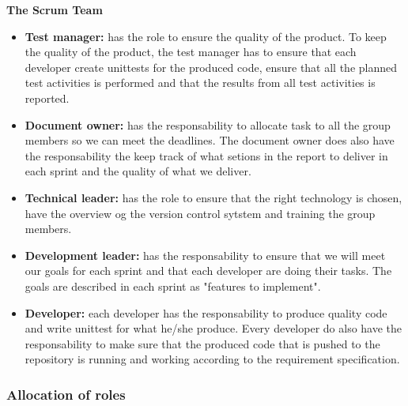 \noindent
{\bf The Scrum Team}
\begin{itemize}

  \item {\bf Test manager:} has the role to ensure the quality of the product. To keep the quality 
  of the product, the test manager has to ensure that each developer create unittests for the 
  produced code, ensure that all the planned test activities is performed and that the results 
  from all test activities is reported.

  \item {\bf Document owner:} has the responsability to allocate task to all the group members so we can meet the deadlines. The document owner does also have the responsability the keep track of what setions in the report to deliver in each sprint and the quality of what we deliver.

  \item {\bf Technical leader:} has the role to ensure that the right technology is
  chosen, have the overview og the version control sytstem and training the group members.

  \item {\bf Development leader:} has the responsability to ensure that we will meet our goals
  for each sprint and that each developer are doing their tasks. The goals are described in each sprint as "features to implement".

  \item {\bf Developer:} each developer has the responsability to produce quality code
  and write unittest for what he/she produce. Every developer do also have the responsability
  to make sure that the produced code that is pushed to the repository is running and working
  according to the requirement specification.
  \end{itemize} 

\subsubsection{Allocation of roles}
